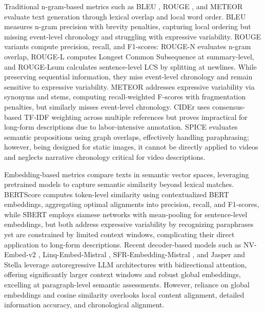 \documentclass[letterpaper]{article} %
\begin{document}
Traditional n-gram-based metrics such as BLEU \citep{p:02}, ROUGE \citep{l:04}, and METEOR \citep{bl:05} evaluate text generation through lexical overlap and local word order. BLEU measures n-gram precision with brevity penalties, capturing local ordering but missing event-level chronology and struggling with expressive variability. ROUGE variants compute precision, recall, and F1-scores: ROUGE-N evaluates n-gram overlap, ROUGE-L computes Longest Common Subsequence at summary-level, and ROUGE-Lsum calculates sentence-level LCS by splitting at newlines. While preserving sequential information, they miss event-level chronology and remain sensitive to expressive variability. METEOR addresses expressive variability via synonyms and stems, computing recall-weighted F-scores with fragmentation penalties, but similarly misses event-level chronology. CIDEr \citep{v:15} uses consensus-based TF-IDF weighting across multiple references but proves impractical for long-form descriptions due to labor-intensive annotation. SPICE \citep{afjg:16} evaluates semantic propositions using graph overlaps, effectively handling paraphrasing; however, being designed for static images, it cannot be directly applied to videos and neglects narrative chronology critical for video descriptions.

Embedding-based metrics compare texts in semantic vector spaces, leveraging pretrained models to capture semantic similarity beyond lexical matches. BERTScore computes token-level similarity using contextualized BERT embeddings, aggregating optimal alignments into precision, recall, and F1-scores, while SBERT employs siamese networks with mean-pooling for sentence-level embeddings, but both address expressive variability by recognizing paraphrases yet are constrained by limited context windows, complicating their direct application to long-form descriptions. Recent decoder-based models such as NV-Embed-v2 \citep{l:24}, Linq-Embed-Mistral \citep{cklg:24}, SFR-Embedding-Mistral \citep{mljx:24}, and Jasper and Stella \citep{zlw:24} leverage autoregressive LLM architectures with bidirectional attention, offering significantly larger context windows and robust global embeddings, excelling at paragraph-level semantic assessments. However, reliance on global embeddings and cosine similarity overlooks local content alignment, detailed information accuracy, and chronological alignment.
\end{document}
